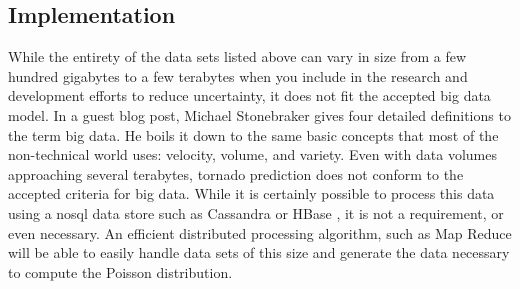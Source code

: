 \subsection{Implementation}
While the entirety of the data sets listed above can vary in size from a few hundred gigabytes to a few terabytes when you include in the research and development efforts to reduce uncertainty, it does not fit the accepted big data model. In a guest blog post, Michael Stonebraker gives four detailed definitions to the term big data\cite{stonebraker}. He boils it down to the same basic concepts that most of the non-technical world uses: velocity, volume, and variety. Even with data volumes approaching several terabytes, tornado prediction does not conform to the accepted criteria for big data. While it is certainly possible to process this data using a \gls{nosql} data store such as Cassandra \cite{cassandra} or HBase \cite{Hbase}, it is not a requirement, or even necessary. An efficient distributed processing algorithm, such as Map Reduce \cite{mapreduce} will be able to easily handle data sets of this size and generate the data necessary to compute the Poisson distribution.



